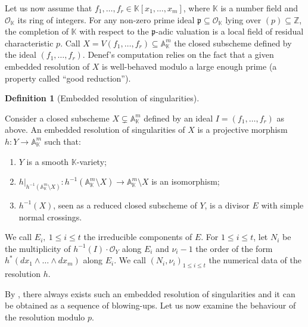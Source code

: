 \documentclass[11pt,english]{article}
\numberwithin{equation}{section}
\numberwithin{figure}{section}
\theoremstyle{definition}
\newtheorem{df}{Definition}[subsection]
\theoremstyle{plain}
\theoremstyle{remark}
\newcommand\ZZ{\mathbb{Z}}
\newcommand\KK{\mathbb{K}}
\begin{document}
Let us now assume that $f_{1},\ldots,f_{r}\in\KK[x_{1},\ldots,x_{m}]$,
where $\KK$ is a number field and $\mathcal{O}_{\KK}$ its ring of
integers. For any non-zero prime ideal $\mathfrak{p}\subseteq\mathcal{O}_{\KK}$
lying over $(p)\subseteq\ZZ$, the completion of $\KK$ with respect
to the $\mathfrak{p}$-adic valuation is a local field of residual
characteristic $p$. Call $X=V(f_{1},\ldots,f_{r})\subseteq\mathbb{A}_{\KK}^{m}$
the closed subscheme defined by the ideal $(f_{1},\ldots,f_{r})$.
Denef's computation relies on the fact that a given embedded resolution
of $X$ is well-behaved modulo a large enough prime (a property called
``good reduction'').

\begin{df}[Embedded resolution of singularities]
\label{Def/EmbedRes}

Consider a closed subscheme $X\subsetneq\mathbb{A}_{\KK}^{m}$ defined
by an ideal $I=(f_{1},\ldots,f_{r})$ as above. An embedded resolution
of singularities of $X$ is a projective morphism $h:Y\rightarrow\mathbb{A}_{\KK}^{m}$
such that:
\begin{enumerate}
\item $Y$ is a smooth $\KK$-variety;
\item $h\vert_{h^{-1}(\mathbb{A}_{\KK}^{m}\setminus X)}:h^{-1}(\mathbb{A}_{\KK}^{m}\setminus X)\rightarrow\mathbb{A}_{\KK}^{m}\setminus X$
is an isomorphism;
\item $h^{-1}(X)$, seen as a reduced closed subscheme of $Y$, is a divisor
$E$ with simple normal crossings.
\end{enumerate}
We call $E_{i},\ 1\leq i\leq t$ the irreducible components of $E$.
For $1\leq i\leq t$, let $N_{i}$ be the multiplicity of $h^{-1}(I)\cdot\mathcal{O}_{Y}$
along $E_{i}$ and $\nu_{i}-1$ the order of the form $h^{*}(dx_{1}\wedge\ldots\wedge dx_{m})$
along $E_{i}$. We call $(N_{i},\nu_{i})_{1\leq i\leq t}$ the numerical
data of the resolution $h$.

\end{df}

By \cite[Main Thm. II.]{Hir64}, there always exists such an embedded
resolution of singularities and it can be obtained as a sequence of
blowing-ups. Let us now examine the behaviour of the resolution modulo
$p$.
\end{document}
